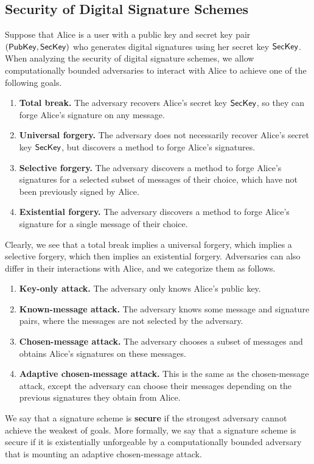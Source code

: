 \subsection{Security of Digital Signature Schemes}
Suppose that Alice is a user with a public key and secret key pair 
$({\sf PubKey}, {\sf SecKey})$ who generates digital signatures using her secret key 
${\sf SecKey}$. When analyzing the security of digital signature schemes, we allow 
computationally bounded adversaries to interact with Alice to achieve one 
of the following goals. 
\begin{enumerate}
    \item \textbf{Total break.} The adversary recovers Alice's secret key 
    ${\sf SecKey}$, so they can forge Alice's signature on any message. 
    \item \textbf{Universal forgery.} The adversary does not necessarily 
    recover Alice's secret key ${\sf SecKey}$, but discovers a method to forge 
    Alice's signatures. 
    \item \textbf{Selective forgery.} The adversary discovers a method to 
    forge Alice's signatures for a selected subset of messages of their choice, 
    which have not been previously signed by Alice. 
    \item \textbf{Existential forgery.} The adversary discovers a method 
    to forge Alice's signature for a single message of their choice. 
\end{enumerate}
Clearly, we see that a total break implies a universal forgery, which implies 
a selective forgery, which then implies an existential forgery. Adversaries 
can also differ in their interactions with Alice, and we categorize them as follows. 
\begin{enumerate}
    \item \textbf{Key-only attack.} The adversary only knows Alice's public key. 
    \item \textbf{Known-message attack.} The adversary knows some message and 
    signature pairs, where the messages are not selected by the adversary. 
    \item \textbf{Chosen-message attack.} The adversary chooses a subset of messages 
    and obtains Alice's signatures on these messages. 
    \item \textbf{Adaptive chosen-message attack.} This is the same as the  
    chosen-message attack, except the adversary can choose their messages 
    depending on the previous signatures they obtain from Alice. 
\end{enumerate}
We say that a signature scheme is \textbf{secure} if the strongest adversary 
cannot achieve the weakest of goals. More formally, we say that a signature 
scheme is secure if it is existentially unforgeable by a computationally
bounded adversary that is mounting an adaptive chosen-message attack. 

